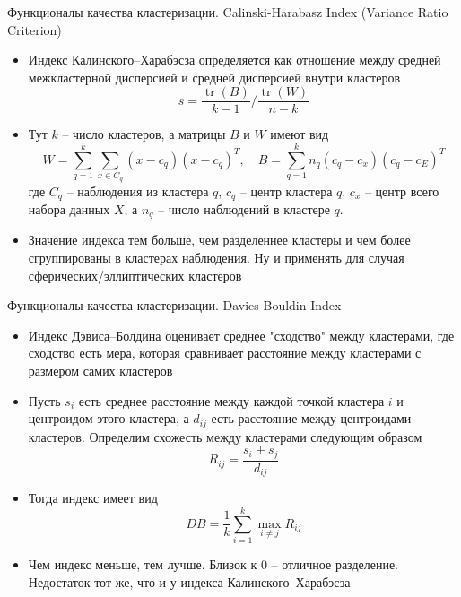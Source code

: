 \documentclass[unicode, notheorems, handout]{beamer}
\begin{document}
\begin{frame}{Функционалы качества кластеризации. Calinski-Harabasz Index (Variance Ratio Criterion)}
\footnotesize

\begin{itemize}
\item Индекс Калинского–Харабэсза определяется как отношение между средней межкластерной дисперсией и средней дисперсией внутри кластеров
\[s = \frac{\operatorname{tr}(B)}{k - 1} / \frac{\operatorname{tr}(W)}{n - k}\]
\item Тут \( k \) – число кластеров, а матрицы \( B \) и \( W \) имеют вид
\[W = \sum_{q=1}^{k} \sum_{x \in C_q} (x - c_q)(x - c_q)^T, \quad B = \sum_{q=1}^{k} n_q(c_q - c_x)(c_q - c_E)^T\]
где \( C_q \) – наблюдения из кластера \( q \), \( c_q \) – центр кластера \( q \), \( c_x \) – центр всего набора данных \( X \), а \( n_q \) – число наблюдений в кластере \( q \).
\item Значение индекса тем больше, чем разделеннее кластеры и чем более сгруппированы в кластерах наблюдения. Ну и применять для случая сферических/эллиптических кластеров
\end{itemize}

\end{frame}

\begin{frame}{Функционалы качества кластеризации. Davies-Bouldin Index}
\footnotesize

\begin{itemize}
\item Индекс Дэвиса–Болдина оценивает среднее "сходство" между кластерами, где сходство есть мера, которая сравнивает расстояние между кластерами с размером самих кластеров
\item Пусть \( s_i \) есть среднее расстояние между каждой точкой кластера \( i \) и центроидом этого кластера, а \( d_{ij} \) есть расстояние между центроидами кластеров. Определим схожесть между кластерами следующим образом
\[R_{ij} = \frac{s_i + s_j}{d_{ij}}\]
\item Тогда индекс имеет вид
\[DB = \frac{1}{k} \sum_{i=1}^{k} \max_{i\neq j} R_{ij}\]
\item Чем индекс меньше, тем лучше. Близок к 0 – отличное разделение. Недостаток тот же, что и у индекса Калинского–Харабэсза
\end{itemize}

\end{frame}
\end{document}
